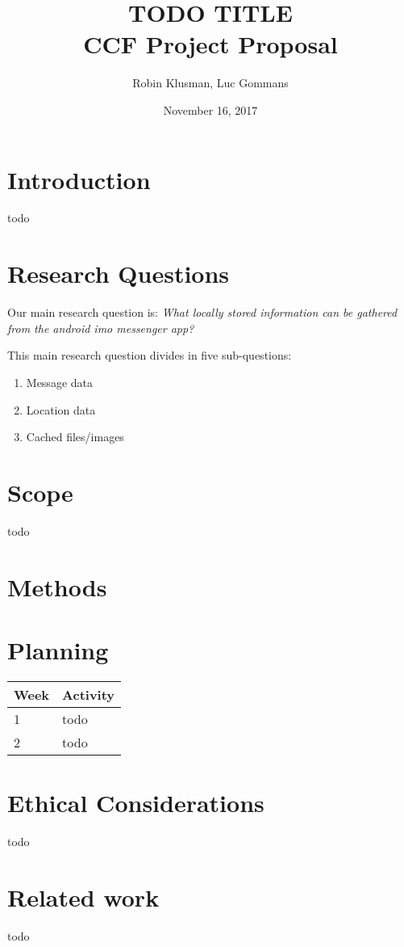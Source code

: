 \documentclass{article}
\title{TODO TITLE \\
	\vspace{0.3cm}
	{\large CCF Project Proposal}
}
\date{November 16, 2017}
\author{Robin Klusman, Luc Gommans}
\begin{document}
\maketitle

\section{Introduction}

todo


\section{Research Questions}

Our main research question is:
{\it What locally stored information can be gathered from the android imo messenger app?}

\vspace{0.5cm}

This main research question divides in five sub-questions:

\begin{enumerate}
	\item Message data
	\item Location data
	\item Cached files/images
\end{enumerate}


\section{Scope}

todo


\section{Methods}




\section{Planning}

\begin{tabular}[H]{ | l | p{10.2cm} | }
	\hline
	\textbf{Week} & \textbf{Activity} \\
	\hline 1 & todo \\
	\hline 2 & todo \\
	\hline
\end{tabular}


\section{Ethical Considerations}

todo


\section{Related work}

todo


\printbibliography
\end{document}
